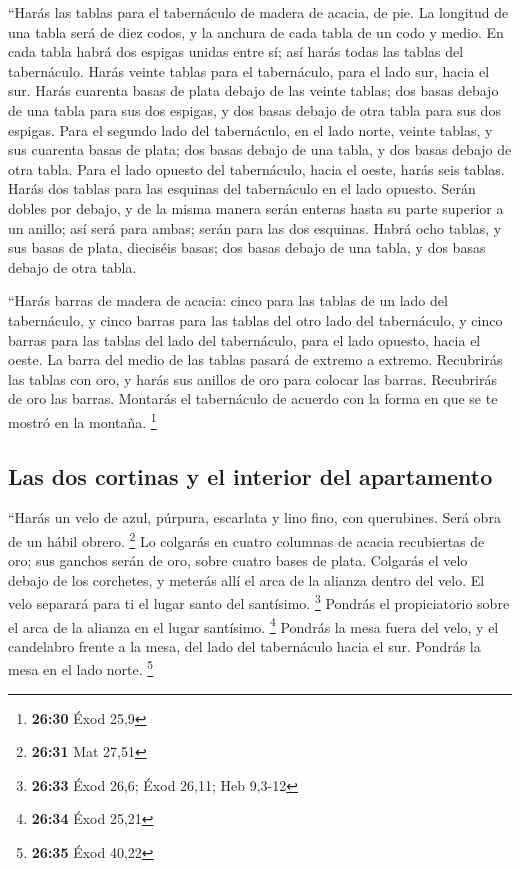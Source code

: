  ``Harás las tablas para el tabernáculo de madera de
acacia, de pie.  La longitud de una tabla será de diez
codos, y la anchura de cada tabla de un codo y medio.  En
cada tabla habrá dos espigas unidas entre sí; así harás todas las tablas
del tabernáculo.  Harás veinte tablas para el
tabernáculo, para el lado sur, hacia el sur.  Harás
cuarenta basas de plata debajo de las veinte tablas; dos basas debajo de
una tabla para sus dos espigas, y dos basas debajo de otra tabla para
sus dos espigas.  Para el segundo lado del tabernáculo,
en el lado norte, veinte tablas,  y sus cuarenta basas de
plata; dos basas debajo de una tabla, y dos basas debajo de otra tabla.
 Para el lado opuesto del tabernáculo, hacia el oeste,
harás seis tablas.  Harás dos tablas para las esquinas
del tabernáculo en el lado opuesto.  Serán dobles por
debajo, y de la misma manera serán enteras hasta su parte superior a un
anillo; así será para ambas; serán para las dos esquinas.
 Habrá ocho tablas, y sus basas de plata, dieciséis
basas; dos basas debajo de una tabla, y dos basas debajo de otra tabla.

 ``Harás barras de madera de acacia: cinco para las
tablas de un lado del tabernáculo,  y cinco barras para
las tablas del otro lado del tabernáculo, y cinco barras para las tablas
del lado del tabernáculo, para el lado opuesto, hacia el oeste.
 La barra del medio de las tablas pasará de extremo a
extremo.  Recubrirás las tablas con oro, y harás sus
anillos de oro para colocar las barras. Recubrirás de oro las barras.
 Montarás el tabernáculo de acuerdo con la forma en que
se te mostró en la montaña. \footnote{\textbf{26:30} Éxod 25,9}

\hypertarget{las-dos-cortinas-y-el-interior-del-apartamento}{%
\subsection{Las dos cortinas y el interior del
apartamento}\label{las-dos-cortinas-y-el-interior-del-apartamento}}

 ``Harás un velo de azul, púrpura, escarlata y lino fino,
con querubines. Será obra de un hábil obrero. \footnote{\textbf{26:31}
  Mat 27,51}  Lo colgarás en cuatro columnas de acacia
recubiertas de oro; sus ganchos serán de oro, sobre cuatro bases de
plata.  Colgarás el velo debajo de los corchetes, y
meterás allí el arca de la alianza dentro del velo. El velo separará
para ti el lugar santo del santísimo. \footnote{\textbf{26:33} Éxod
  26,6; Éxod 26,11; Heb 9,3-12}  Pondrás el propiciatorio
sobre el arca de la alianza en el lugar santísimo. \footnote{\textbf{26:34}
  Éxod 25,21}  Pondrás la mesa fuera del velo, y el
candelabro frente a la mesa, del lado del tabernáculo hacia el sur.
Pondrás la mesa en el lado norte. \footnote{\textbf{26:35} Éxod 40,22}

